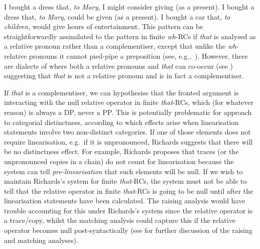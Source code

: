 \documentclass[output=paper]{langsci/langscibook}
\begin{document}
\ea\label{ex:2.98}
    \ea    I bought a dress that, \textit{to Mary}, I might consider giving (as a present).
    \ex    I bought a dress that, \textit{to Mary}, could be given (as a present).
    \ex    I bought a car that, \textit{to children}, would give hours of entertainment.
    \z
\ex\label{ex:2.99}
    \z
\z
This pattern can be straightforwardly assimilated to the pattern in finite
\emph{wh}{-\glspl{RC} if} \emph{that} is analysed as a relative
pronoun rather than a complementiser, except that unlike
the \emph{wh}{-relative pronouns it cannot pied-pipe a
preposition} (see, e.g.,~\citealt{Kayne2014}). However, there are dialects of
 where both a relative pronouns and \emph{that} can co-occur (see
\citealt[6]{Trotta2004}) suggesting that \emph{that} is not a relative pronoun
and is in fact a complementiser.

If \emph{that} is a complementiser, we can hypothesise that the fronted
argument is interacting with the null relative operator in finite
\emph{that}-RCs, which (for whatever reason) is always a DP, never a PP\@. This
is potentially problematic for  approach to categorial
distinctness, according to which  effects arise when
linearisation statements involve two non-distinct categories. If one of those
elements does not require linearisation, e.g.\ if it is unpronounced, Richards
suggests that there will be no distinctness effect. For example, Richards
proposes that traces (or the unpronounced copies in a  chain) do not
count for linearisation because the system can tell \emph{pre-linearisation}
that such elements will be null. If we wish to maintain Richards’s system for
finite \emph{that}{-RCs, the system must not be able to tell that the relative
    operator in finite} \emph{that}{-\glspl{RC} is going to be null until after the
linearisation statements have been calculated. The raising analysis would have
trouble accounting for this under Richards’s system} since the relative operator
is a trace/copy, whilst the matching analysis could capture this if the
relative operator becomes null post-syntactically (see \citealt{Douglas2016}
for further discussion of the raising and matching analyses).
\end{document}
